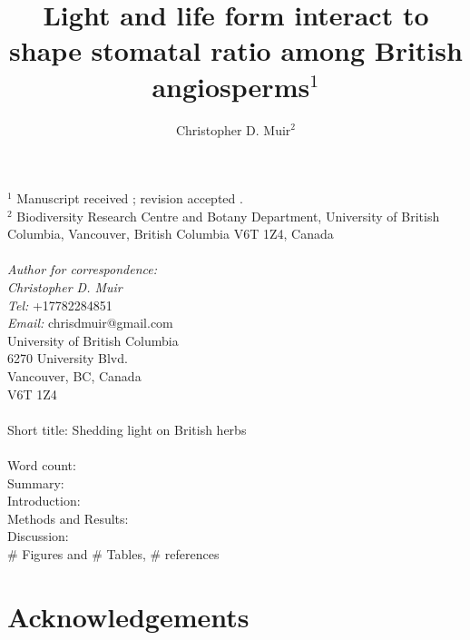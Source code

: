 \documentclass[12pt, oneside]{article}
\begin{document}


\title{Light and life form interact to shape stomatal ratio among British angiosperms$^1$}
\author{Christopher D. Muir$^2$}
\date{} %

\maketitle

$^1$ Manuscript received \underline{     }; revision accepted \underline{     }. \\

$^2$ Biodiversity Research Centre and Botany Department, University of British Columbia, Vancouver, British Columbia V6T 1Z4, Canada \\
\\
\textit{Author for correspondence:} \\
\textit{Christopher D. Muir} \\
\textit{Tel:} +17782284851 \\
\textit{Email:} chrisdmuir@gmail.com \\
University of British Columbia \\
6270 University Blvd. \\
Vancouver, BC, Canada \\
V6T 1Z4 \\
\\
Short title: Shedding light on British herbs\\
\\
Word count: \\
Summary:  \\
Introduction:  \\
Methods and Results:  \\
Discussion:  \\
\# Figures and \# Tables, \# references


\section*{Acknowledgements}

\end{document}
